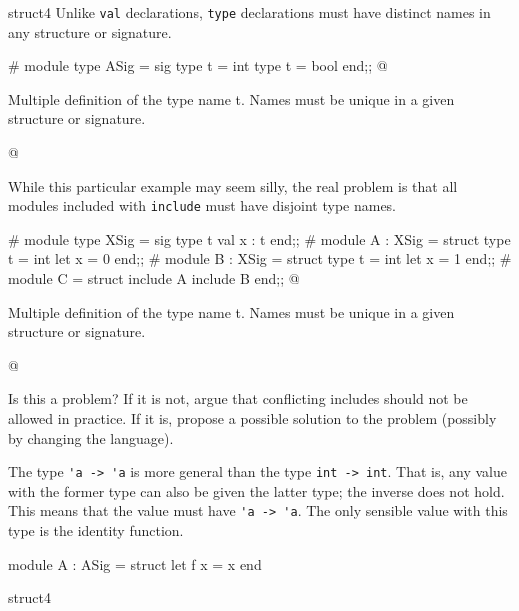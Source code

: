 % 
%
\begin{exercise}{struct4}
Unlike \hbox{\lstinline/val/} declarations, \hbox{\lstinline/type/}
declarations must have distinct names in any structure or signature.

\begin{ocaml}
# module type ASig = sig
     type t = int
     type t = bool
  end;;
@
\begin{toperror}
Multiple definition of the type name t.
Names must be unique in a given structure or signature.
\end{toperror}
@
\end{ocaml}
%
While this particular example may seem silly, the real problem is that
all modules included with \lstinline$include$ must have disjoint type
names.

\begin{ocaml}
# module type XSig = sig
     type t
     val x : t
  end;;
# module A : XSig = struct
     type t = int
     let x = 0
  end;;
# module B : XSig = struct
     type t = int
     let x = 1
  end;;
# module C = struct
     include A
     include B
  end;;
@
\begin{toperror}
Multiple definition of the type name t.
Names must be unique in a given structure or signature.
\end{toperror}
@
\end{ocaml}
%
Is this a problem?  If it is not, argue that conflicting includes
should not be allowed in practice.  If it is, propose a possible
solution to the problem (possibly by changing the language).

\begin{answer}\ifanswers
The type \hbox{\lstinline$'a -> 'a$} is more general than the
type \hbox{\lstinline$int -> int$}.  That is, any value with the
former type can also be given the latter type; the inverse does not
hold.  This means that the value must have
\hbox{\lstinline$'a -> 'a$}.
The only sensible value with this type is the identity function.

\begin{ocaml}
module A : ASig = struct
   let f x = x
end
\end{ocaml}
\end{answer}

\begin{answer}{struct4}
\fi\end{answer}
\end{exercise}

